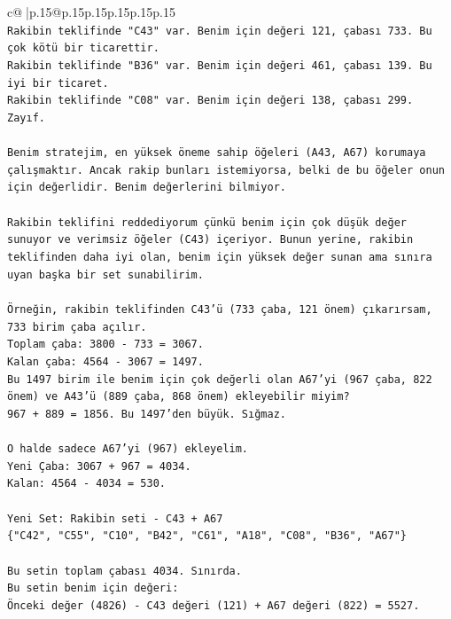 \documentclass{article}
\begin{document}
{\begin{supertabular}{c@{$\;$}|p{.15\linewidth}@{}p{.15\linewidth}p{.15\linewidth}p{.15\linewidth}p{.15\linewidth}p{.15\linewidth}}
{{{\\ 
\texttt{Rakibin teklifinde "C43" var. Benim için değeri 121, çabası 733. Bu çok kötü bir ticarettir.} \\
\texttt{Rakibin teklifinde "B36" var. Benim için değeri 461, çabası 139. Bu iyi bir ticaret.} \\
\texttt{Rakibin teklifinde "C08" var. Benim için değeri 138, çabası 299. Zayıf.} \\
\\ 
\texttt{Benim stratejim, en yüksek öneme sahip öğeleri (A43, A67) korumaya çalışmaktır. Ancak rakip bunları istemiyorsa, belki de bu öğeler onun için değerlidir. Benim değerlerini bilmiyor.} \\
\\ 
\texttt{Rakibin teklifini reddediyorum çünkü benim için çok düşük değer sunuyor ve verimsiz öğeler (C43) içeriyor. Bunun yerine, rakibin teklifinden daha iyi olan, benim için yüksek değer sunan ama sınıra uyan başka bir set sunabilirim.} \\
\\ 
\texttt{Örneğin, rakibin teklifinden C43'ü (733 çaba, 121 önem) çıkarırsam, 733 birim çaba açılır.} \\
\texttt{Toplam çaba: 3800 {-} 733 = 3067.} \\
\texttt{Kalan çaba: 4564 {-} 3067 = 1497.} \\
\texttt{Bu 1497 birim ile benim için çok değerli olan A67'yi (967 çaba, 822 önem) ve A43'ü (889 çaba, 868 önem) ekleyebilir miyim?} \\
\texttt{967 + 889 = 1856. Bu 1497'den büyük. Sığmaz.} \\
\\ 
\texttt{O halde sadece A67'yi (967) ekleyelim.} \\
\texttt{Yeni Çaba: 3067 + 967 = 4034.} \\
\texttt{Kalan: 4564 {-} 4034 = 530.} \\
\\ 
\texttt{Yeni Set: Rakibin seti {-} C43 + A67} \\
\texttt{\{"C42", "C55", "C10", "B42", "C61", "A18", "C08", "B36", "A67"\}} \\
\\ 
\texttt{Bu setin toplam çabası 4034. Sınırda.} \\
\texttt{Bu setin benim için değeri:} \\
\texttt{Önceki değer (4826) {-} C43 değeri (121) + A67 değeri (822) = 5527.} \\
\\ 
}}}
\end{supertabular}}
\end{document}
